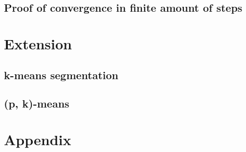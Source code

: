 \documentclass[11pt]{article}
\begin{document}
\subsection{Proof of convergence in finite amount of steps}

\section{Extension}
\subsection{k-means segmentation}

\subsection{(p, k)-means}

\section{Appendix}
\end{document}
